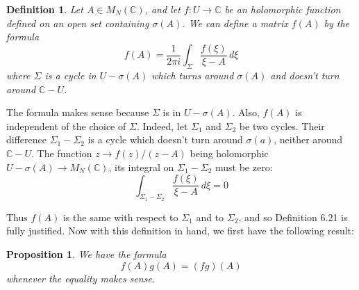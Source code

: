 \documentclass[12pt]{amsbook}
\newtheorem{definition}[theorem]{Definition}
\newtheorem{proposition}[theorem]{Proposition}
\begin{document}
\begin{definition}
Let $A\in M_N(\mathbb C)$, and let $f:U\to\mathbb C$ be an holomorphic function defined on an open set containing $\sigma(A)$. We can define a matrix $f(A)$ by the formula
$$f(A)=\frac{1}{2\pi i}\int_\Sigma\frac{f(\xi)}{\xi-A}\,d\xi$$
where $\Sigma$ is a cycle in $U-\sigma(A)$ which turns around $\sigma(A)$ and doesn't turn around $\mathbb C-U$.
\end{definition}

The formula makes sense because $\Sigma$ is in $U-\sigma(A)$. Also, $f(A)$ is independent of the choice of $\Sigma$. Indeed, let $\Sigma_1$ and $\Sigma_2$ be two cycles. Their difference $\Sigma_1-\Sigma_2$ is a cycle which doesn't turn around $\sigma(a)$, neither around $\mathbb C-U$. The function $z\to f(z)/(z-A)$ being holomorphic $U-\sigma(A)\to M_N(\mathbb C)$, its integral on $\Sigma_1-\Sigma_2$ must be zero:
$$\int_{\Sigma_1-\Sigma_2}\frac{f(\xi)}{\xi-A}\,d\xi =0$$

Thus $f(A)$ is the same with respect to $\Sigma_1$ and to $\Sigma_2$, and so Definition 6.21 is fully justified. Now with this definition in hand, we first have the following result:

\begin{proposition}
We have the formula
$$f(A)g(A)=(fg)(A)$$
whenever the equality makes sense.
\end{proposition}
\end{document}
